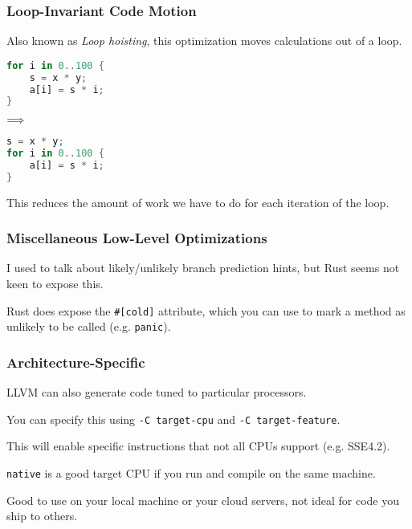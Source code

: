 \begin{frame}[fragile]
\frametitle{Loop-Invariant Code Motion}

 Also known as \emph{Loop hoisting},
this optimization moves calculations out of a loop. 
\begin{center}
\vspace*{-1em}
\begin{minipage}{.3\textwidth}
  \begin{lstlisting}[language=Rust]
for i in 0..100 {
    s = x * y;
    a[i] = s * i;
}
  \end{lstlisting}
  \end{minipage} $\Longrightarrow \hspace*{2em}$ \begin{minipage}{.4\textwidth}
  \begin{lstlisting}[language=Rust]
s = x * y;
for i in 0..100 {
    a[i] = s * i;
}
  \end{lstlisting}
  \end{minipage}
  \end{center}


This reduces the amount of work we have to do for each iteration of the loop.

\end{frame}


\begin{frame}[fragile]
\frametitle{Miscellaneous Low-Level Optimizations}

I used to talk about likely/unlikely branch prediction hints,
but Rust seems not keen to expose this. 

Rust does expose the \verb+#[cold]+
attribute, which you can use to mark a method as unlikely to be called (e.g. \texttt{panic}).


\end{frame}


\begin{frame}
\frametitle{Architecture-Specific}

LLVM can also generate code tuned to particular
processors. 

 You can specify this using {\tt  -C target-cpu} and {\tt -C target-feature}.

This will enable specific instructions that not all CPUs support (e.g. SSE4.2).

{\tt native} is a good target CPU if you run and compile on the same machine.

\noindent
Good to use on your local machine or your cloud servers, not ideal for code you ship to others.


\end{frame}



